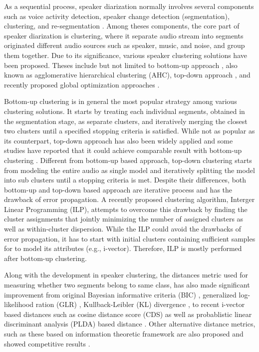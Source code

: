 \documentclass[journal,10pt]{IEEEtran}
\begin{document}
As a sequential process, speaker diarization normally involves several components such as voice activity detection, speaker change detection (segmentation), clustering, and re-segmentation \cite{reynolds2005approaches,tranter2006overview,anguera2012speaker}. Among theses components, the core part of speaker diarization is clustering, where it separate audio stream into segments originated different audio sources such as speaker, music, and noise, and group them together. Due to its significance, various speaker clustering solutions have been proposed. Theses include but not limited to bottom-up approach \cite{wooters2008icsi,vijayasenan2009information,sun2010speaker}, also known as agglomerative hierarchical clustering (AHC), top-down approach \cite{meignier2006step,bozonnet2010lia,shum2013unsupervised}, and recently proposed global optimization approaches \cite{rouvier2012global, dupuy2014recent}. 

Bottom-up clustering is in general the most popular strategy among various clustering solutions. It starts by treating each individual segments, obtained in the segmentation stage, as separate clusters, and iteratively merging the closest two clusters until a specified stopping criteria is satisfied. While not as popular as its counterpart, top-down approach has also been widely applied and some studies have reported that it could achieve comparable result with bottom-up clustering \cite{evans2012comparative}. Different from bottom-up based approach, top-down clustering starts from modeling the entire audio as single model and iteratively splitting the model into sub clusters until a stopping criteria is met. Despite their differences, both bottom-up and top-down based approach are iterative process and has the drawback of error propagation. A recently proposed clustering algorithm, Interger Linear Programming (ILP)\cite{rouvier2012global, dupuy2014recent}, attempts to overcome this drawback by finding the cluster assignments that jointly minimizing the number of assigned clusters as well as within-cluster dispersion. While the ILP could avoid the drawbacks of error propagation, it has to start with initial clusters containing sufficient samples for to model its attributes (e.g., i-vector). Therefore, ILP is mostly performed after bottom-up clustering.

Along with the development in speaker clustering, the distances metric used for measuring whether two segments belong to same class, has also made significant improvement from original Bayesian informative criteria (BIC) \cite{chen1998speaker,zhou2000unsupervised}, generalized log-likelihood ration (GLR) \cite{solomonoff1998clustering}, Kullback-Leibler (KL) divergence \cite{siegler1997automatic}, to recent i-vector based distances such as cosine distance score (CDS) \cite{dehak2011front} as well as probablistic linear discriminant analysis (PLDA) based distance \cite{prince2007probabilistic,kenny2010bayesian}. Other alternative distance metrics, such as these based on information theoretic framework are also proposed and showed competitive results \cite{vijayasenan2009information}. 
\end{document}
